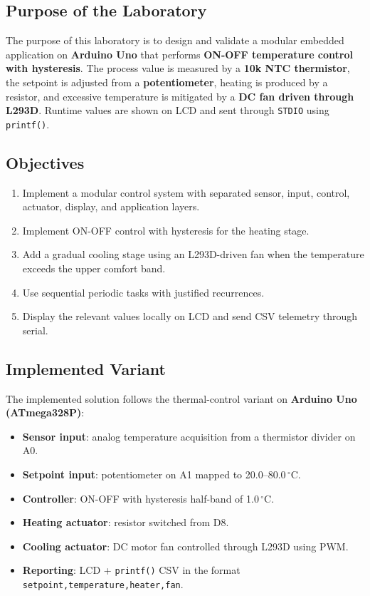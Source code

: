 \documentclass[12pt]{article}
\begin{document}
\subsection*{Purpose of the Laboratory}
\hspace{0.8cm} The purpose of this laboratory is to design and validate a modular embedded application on \textbf{Arduino Uno} that performs \textbf{ON-OFF temperature control with hysteresis}. The process value is measured by a \textbf{10k NTC thermistor}, the setpoint is adjusted from a \textbf{potentiometer}, heating is produced by a resistor, and excessive temperature is mitigated by a \textbf{DC fan driven through L293D}. Runtime values are shown on LCD and sent through \texttt{STDIO} using \texttt{printf()}.

\subsection*{Objectives}
\begin{enumerate}
    \item Implement a modular control system with separated sensor, input, control, actuator, display, and application layers.
    \item Implement ON-OFF control with hysteresis for the heating stage.
    \item Add a gradual cooling stage using an L293D-driven fan when the temperature exceeds the upper comfort band.
    \item Use sequential periodic tasks with justified recurrences.
    \item Display the relevant values locally on LCD and send CSV telemetry through serial.
\end{enumerate}

\subsection*{Implemented Variant}
\hspace{0.8cm} The implemented solution follows the thermal-control variant on \textbf{Arduino Uno (ATmega328P)}:
\begin{itemize}
    \item \textbf{Sensor input}: analog temperature acquisition from a thermistor divider on A0.
    \item \textbf{Setpoint input}: potentiometer on A1 mapped to 20.0--80.0\,$^{\circ}$C.
    \item \textbf{Controller}: ON-OFF with hysteresis half-band of 1.0\,$^{\circ}$C.
    \item \textbf{Heating actuator}: resistor switched from D8.
    \item \textbf{Cooling actuator}: DC motor fan controlled through L293D using PWM.
    \item \textbf{Reporting}: LCD + \texttt{printf()} CSV in the format \texttt{setpoint,temperature,heater,fan}.
\end{itemize}
\end{document}
